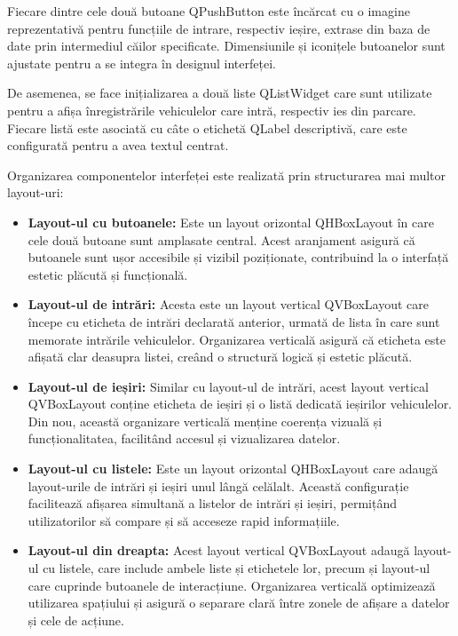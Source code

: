 \documentclass[a4paper,12pt]{report}
\begin{document}
Fiecare dintre cele două butoane QPushButton este încărcat cu o imagine reprezentativă pentru funcțiile de intrare, respectiv ieșire, extrase din baza de date prin intermediul căilor specificate. Dimensiunile și iconițele butoanelor sunt ajustate pentru a se integra în designul interfeței.

De asemenea, se face inițializarea a două liste QListWidget care sunt utilizate pentru a afișa înregistrările vehiculelor care intră, respectiv ies din parcare. Fiecare listă este asociată cu câte o etichetă QLabel descriptivă, care este configurată pentru a avea textul centrat.

Organizarea componentelor interfeței este realizată prin structurarea mai multor layout-uri:
\begin{itemize}
    \item \textbf{Layout-ul cu butoanele:} Este un layout orizontal QHBoxLayout în care cele două butoane sunt amplasate central. Acest aranjament asigură că butoanele sunt ușor accesibile și vizibil poziționate, contribuind la o interfață estetic plăcută și funcțională.

    \item \textbf{Layout-ul de intrări:} Acesta este un layout vertical QVBoxLayout care începe cu eticheta de intrări declarată anterior, urmată de lista în care sunt memorate intrările vehiculelor. Organizarea verticală asigură că eticheta este afișată clar deasupra listei, creând o structură logică și estetic plăcută.

    \item \textbf{Layout-ul de ieșiri:} Similar cu layout-ul de intrări, acest layout vertical QVBoxLayout conține eticheta de ieșiri și o listă dedicată ieșirilor vehiculelor. Din nou, această organizare verticală menține coerența vizuală și funcționalitatea, facilitând accesul și vizualizarea datelor.

    \item \textbf{Layout-ul cu listele:} Este un layout orizontal QHBoxLayout care adaugă layout-urile de intrări și ieșiri unul lângă celălalt. Această configurație facilitează afișarea simultană a listelor de intrări și ieșiri, permițând utilizatorilor să compare și să acceseze rapid informațiile.

    \item \textbf{Layout-ul din dreapta:} Acest layout vertical QVBoxLayout adaugă layout-ul cu listele, care include ambele liste și etichetele lor, precum și layout-ul care cuprinde butoanele de interacțiune. Organizarea verticală optimizează utilizarea spațiului și asigură o separare clară între zonele de afișare a datelor și cele de acțiune.


\end{itemize}
\end{document}
